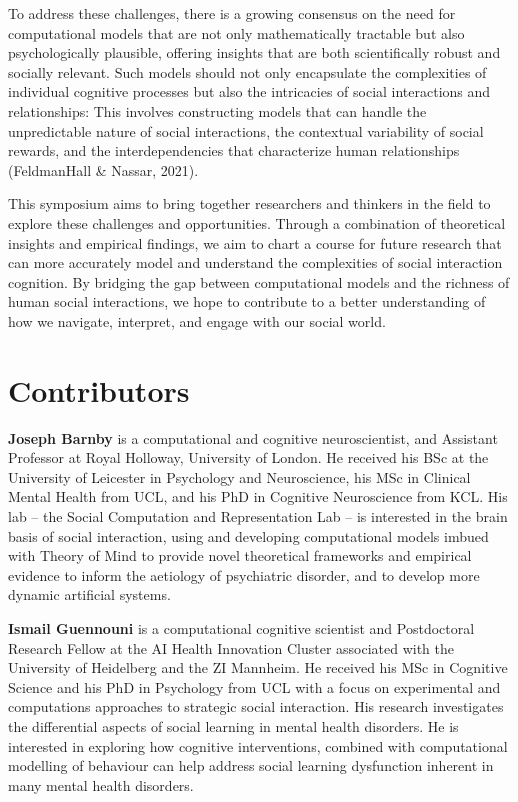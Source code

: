 \documentclass[10pt, letterpaper]{article}
\begin{document}
To address these challenges, there is a growing consensus on the need
for computational models that are not only mathematically tractable but
also psychologically plausible, offering insights that are both
scientifically robust and socially relevant. Such models should not only
encapsulate the complexities of individual cognitive processes but also
the intricacies of social interactions and relationships: This involves
constructing models that can handle the unpredictable nature of social
interactions, the contextual variability of social rewards, and the
interdependencies that characterize human relationships (FeldmanHall \&
Nassar, 2021).

This symposium aims to bring together researchers and thinkers in the
field to explore these challenges and opportunities. Through a
combination of theoretical insights and empirical findings, we aim to
chart a course for future research that can more accurately model and
understand the complexities of social interaction cognition. By bridging
the gap between computational models and the richness of human social
interactions, we hope to contribute to a better understanding of how we
navigate, interpret, and engage with our social world.

\hypertarget{contributors}{%
\section{Contributors}\label{contributors}}

\textbf{Joseph Barnby} is a computational and cognitive neuroscientist,
and Assistant Professor at Royal Holloway, University of London. He
received his BSc at the University of Leicester in Psychology and
Neuroscience, his MSc in Clinical Mental Health from UCL, and his PhD in
Cognitive Neuroscience from KCL. His lab -- the Social Computation and
Representation Lab -- is interested in the brain basis of social
interaction, using and developing computational models imbued with
Theory of Mind to provide novel theoretical frameworks and empirical
evidence to inform the aetiology of psychiatric disorder, and to develop
more dynamic artificial systems.

\textbf{Ismail Guennouni} is a computational cognitive scientist and
Postdoctoral Research Fellow at the AI Health Innovation Cluster
associated with the University of Heidelberg and the ZI Mannheim. He
received his MSc in Cognitive Science and his PhD in Psychology from UCL
with a focus on experimental and computations approaches to strategic
social interaction. His research investigates the differential aspects
of social learning in mental health disorders. He is interested in
exploring how cognitive interventions, combined with computational
modelling of behaviour can help address social learning dysfunction
inherent in many mental health disorders.
\end{document}
